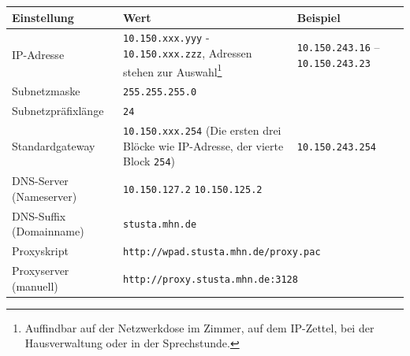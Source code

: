 \documentclass[a4paper,12pt]{scrartcl}
\begin{document}
\begin{center}
  \begin{tabularx}{\linewidth}{|lXp{.2\linewidth}|}
    \hline
    Einstellung & Wert & Beispiel \\
    \hline \hline
    IP-Adresse & \nolinkurl{10.150.xxx.yyy} - \nolinkurl{10.150.xxx.zzz}, \newline 8 Adressen stehen zur Auswahl\footnote{Auffindbar auf der Netzwerkdose im Zimmer, auf dem IP-Zettel, bei der Hausverwaltung oder in der Sprechstunde.} & \nolinkurl{10.150.243.16} – \nolinkurl{10.150.243.23} \\
    \hline
    Subnetzmaske & \nolinkurl{255.255.255.0} & \\
    \hline
    Subnetzpräfixlänge & \nolinkurl{24} & \\
    \hline
    Standardgateway & \nolinkurl{10.150.xxx.254} \newline (Die ersten drei Blöcke wie IP-Adresse, der vierte Block \nolinkurl{254}) & \nolinkurl{10.150.243.254} \\
    \hline
    DNS-Server (Nameserver) & \nolinkurl{10.150.127.2} \newline \nolinkurl{10.150.125.2} & \\
    \hline
    DNS-Suffix (Domainname) & \nolinkurl{stusta.mhn.de} & \\
    \hline
    Proxyskript & \multicolumn{2}{l|}{\nolinkurl{http://wpad.stusta.mhn.de/proxy.pac}} \\
    \hline
    Proxyserver (manuell) & \multicolumn{2}{l|}{\nolinkurl{http://proxy.stusta.mhn.de:3128}} \\
    \hline
  \end{tabularx}
\end{center}
\end{document}
